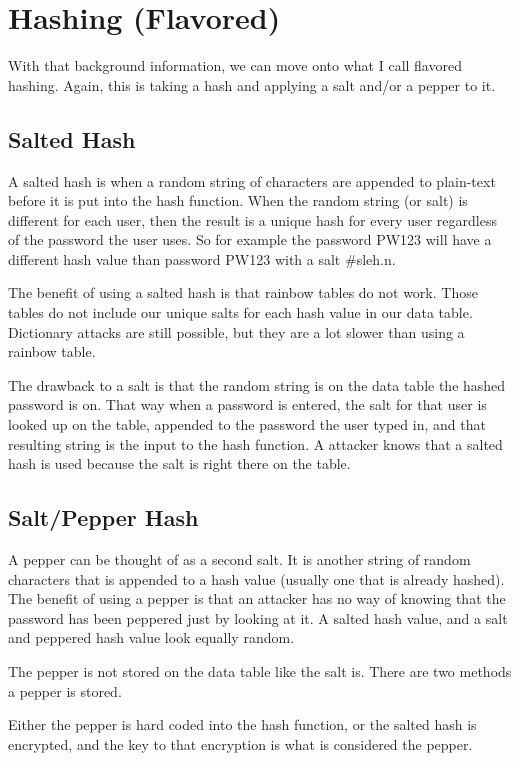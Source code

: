 \documentclass[12pt]{article}
\begin{document}
\section{Hashing (Flavored)}
With that background information, we can move onto what I call flavored hashing. Again, this is taking a hash and applying a salt and/or a pepper to it. 

\subsection{\indent Salted Hash}
A salted hash is when a random string of characters are appended to plain-text before it is put into the hash function. When the random string (or salt) is different for each user, then the result is a unique hash for every user regardless of the password the user uses. So for example the password PW123 will have a different hash value than password PW123 with a salt \#sleh.n.

The benefit of using a salted hash is that rainbow tables do not work. Those tables do not include our unique salts for each hash value in our data table. Dictionary attacks are still possible, but they are a lot slower than using a rainbow table. 

The drawback to a salt is that the random string is on the data table the hashed password is on. That way when a password is entered, the salt for that user is looked up on the table, appended to the password the user typed in, and that resulting string is the input to the hash function. A attacker knows that a salted hash is used because the salt is right there on the table. 

\subsection{\indent Salt/Pepper Hash}
A pepper can be thought of as a second salt. It is another string of random characters that is appended to a hash value (usually one that is already hashed). The benefit of using a pepper is that an attacker has no way of knowing that the password has been peppered just by looking at it. A salted hash value, and a salt and peppered hash value look equally random. 

The pepper is not stored on the data table like the salt is. There are two methods a pepper is stored. 

Either the pepper is hard coded into the hash function, or the salted hash is encrypted, and the key to that encryption is what is considered the pepper. 
\end{document}
